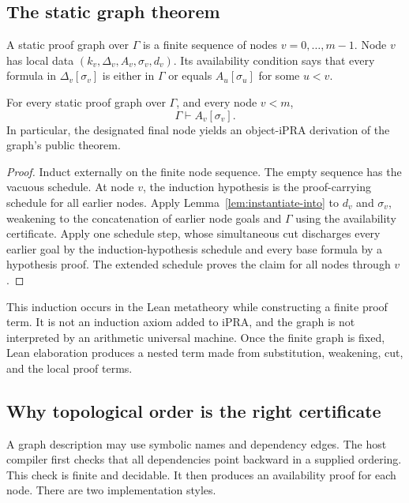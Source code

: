 \subsection{The static graph theorem}

\begin{definition}
A static proof graph over \(\Gamma\) is a finite sequence of nodes \(v=0,\ldots,m-1\).  Node \(v\) has
local data \((k_v,\Delta_v,A_v,\sigma_v,d_v)\).  Its availability condition says that every formula in
\(\Delta_v[\sigma_v]\) is either in \(\Gamma\) or equals \(A_u[\sigma_u]\) for some \(u<v\).
\end{definition}

\begin{theorem}
\label{thm:staged-graph}
For every static proof graph over \(\Gamma\), and every node \(v<m\),
\[
  \Gamma\vdash A_v[\sigma_v].
\]
In particular, the designated final node yields an object-iPRA derivation of the graph's public theorem.
\end{theorem}

\begin{proof}
Induct externally on the finite node sequence.  The empty sequence has the vacuous schedule.  At node
\(v\), the induction hypothesis is the proof-carrying schedule for all earlier nodes.  Apply
Lemma~\ref{lem:instantiate-into} to \(d_v\) and \(\sigma_v\), weakening to the concatenation of earlier
node goals and \(\Gamma\) using the availability certificate.  Apply one schedule step, whose simultaneous
cut discharges every earlier goal by the induction-hypothesis schedule and every base formula by a
hypothesis proof.  The extended schedule proves the claim for all nodes through \(v\).
\end{proof}

This induction occurs in the Lean metatheory while constructing a finite proof term.  It is not an
induction axiom added to iPRA, and the graph is not interpreted by an arithmetic universal machine.  Once
the finite graph is fixed, Lean elaboration produces a nested term made from substitution, weakening, cut,
and the local proof terms.

\subsection{Why topological order is the right certificate}

A graph description may use symbolic names and dependency edges.  The host compiler first checks that all
dependencies point backward in a supplied ordering.  This check is finite and decidable.  It then produces
an availability proof for each node.  There are two implementation styles.

